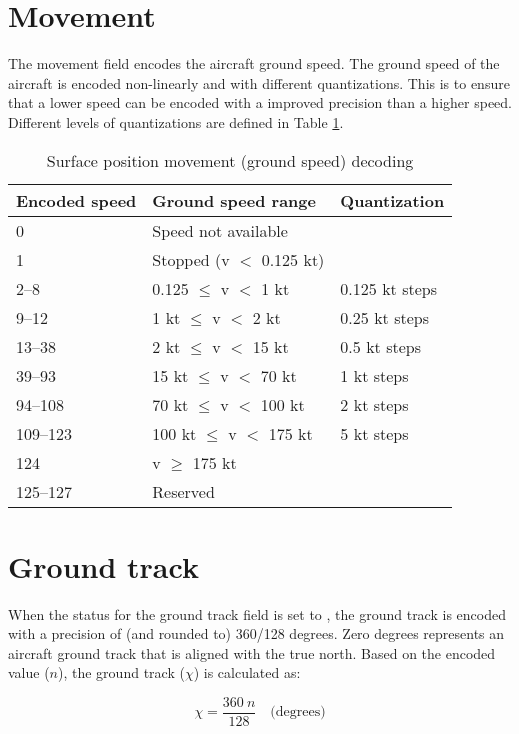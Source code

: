 \section{Movement}

The movement field encodes the aircraft ground speed. The ground speed of the aircraft is encoded non-linearly and with different quantizations. This is to ensure that a lower speed can be encoded with a improved precision than a higher speed. Different levels of quantizations are defined in Table \ref{tb:adsb-surf-pos-mov}.

\begin{table}[ht]
\caption{Surface position movement (ground speed) decoding}
\label{tb:adsb-surf-pos-mov}
\begin{tabular}{|l|l|l|}
\hline
\textbf{Encoded speed} & \textbf{Ground speed range} & \textbf{Quantization} \\ \hline
0 & Speed not available &  \\ \hline
1 & Stopped (v $<$ 0.125 kt) &  \\ \hline
2--8 & 0.125 $\leq$ v $<$ 1 kt & 0.125 kt steps \\ \hline
9--12 & 1 kt $\leq$ v $<$ 2 kt & 0.25 kt steps \\ \hline
13--38 & 2 kt $\leq$ v $<$ 15 kt & 0.5 kt steps \\ \hline
39--93 & 15 kt $\leq$ v $<$ 70 kt & 1 kt steps \\ \hline
94--108 & 70 kt $\leq$ v $<$ 100 kt & 2 kt steps \\ \hline
109--123 & 100 kt $\leq$ v $<$ 175 kt & 5 kt steps \\ \hline
124 & v $\ge$ 175 kt &  \\ \hline
125--127 & Reserved &  \\ \hline
\end{tabular}
\end{table}


\section{Ground track}

When the status for the ground track field is set to \1, the ground track is encoded with a precision of (and rounded to) 360/128 degrees. Zero degrees represents an aircraft ground track that is aligned with the true north. Based on the encoded value ($n$), the ground track ($\chi$) is calculated as:

\begin{equation}
    \chi = \frac{360~n}{128} \quad \text{(degrees)}
\end{equation}

